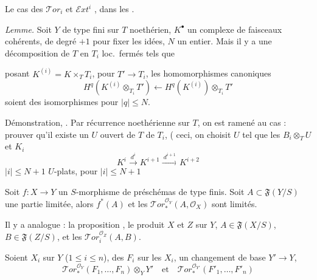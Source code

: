 \documentclass[11pt,a4paper]{article}
\begin{document}
Le cas des $\mathcal{T}or_i$ et $\mathcal{E}xt^i$ \ill{} \ill{}
, \ill{} \ill{} dans les \ill{} \ill{} \ill{}.

\emph{Lemme.} Soit $Y$ de type fini sur $T$ noethérien, $K^{\bullet}$ un
complexe de faisceaux cohérents,  
de degré $+1$ pour fixer les idées, $N$ un entier. Mais il y a une
décomposition  de $T$ en $T_i$ loc.\ fermés tels que

 posant $K^{(i)} = K \times_T T_i$, pour 
$T' \to T_i$, les homomorphismes canoniques
\[
  H^q(K^{(i)} \otimes_{T_i} T') \longleftarrow H^q(K^{(i)}) \otimes_{T_i} T'
\]
soient des isomorphismes pour $|q| \le N$.

Démonstration,  \ill{} \ill{}. Par récurrence
noethérienne sur $T$, on est ramené au cas \ill{} : prouver qu'il existe
un $U$ ouvert  de $T$   \ill{} de $T_i$, (
ceci, on choisit $U$ tel que les $B_i \otimes_T U$ \ill{}
\struck{\ill{} \ill{} \ill{}} \struck{\ill{}} et $K_i$
\[
  K^{i} \xrightarrow{\ d^{i}\ } K^{i+1} \xrightarrow{\ d^{i+1}\ } K^{i+2}
\]
  $|i| \le N+1$  \ill{} $U$-plats, pour
$|i| \le N+1$ \ill{}

Soit $f : X \to Y$ un $S$-morphisme de préschémas de type finis. Soit
$A \subset \mathfrak{F}(Y/S)$ une partie limitée, alors $f^{*}(A)$ et les
$\mathcal{T}or_{*}^{\mathcal{O}_Y}(A, \mathcal{O}_X)$ sont limités.

Il y a  analogue : \ill{} \ill{} la proposition
\ill{},  le produit \ill{} $X$ et $Z$ sur $Y$,
\struck{\ill{}} $A \in \mathfrak{F}(X/S)$, $B \in \mathfrak{F}(Z/S)$, et
les $\mathcal{T}or_i^{\mathcal{O}_Z}(A, B)$.

Soient $X_i$ sur $Y$ ($1 \le i \le n$), des $F_i$ sur les
$X_i$, \struck{\ill{}} un changement de base $Y' \to Y$, 
\[
  \mathcal{T}or_{*}^{\mathcal{O}_Y}(F_1, \ldots, F_n) \otimes_Y Y'
  \quad\text{et}\quad
  \mathcal{T}or_{*}^{\mathcal{O}_{Y'}}(F'_1, \ldots, F'_n)
\]
\end{document}
